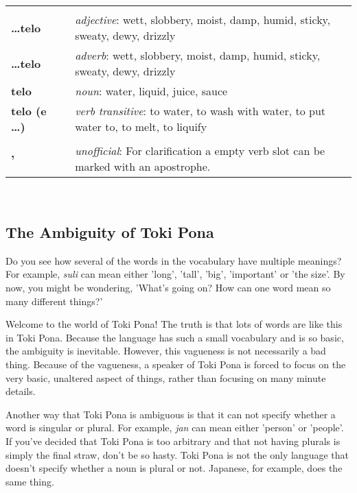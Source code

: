 \begin{supertabular}{p{2,5cm}|ll}
 && \\ %
%
\textbf{\dots telo} && \textit{adjective}: wett, slobbery, moist, damp, humid, sticky, sweaty, dewy, drizzly \\ %
\textbf{\dots telo} && \textit{adverb}: wett, slobbery, moist, damp, humid, sticky, sweaty, dewy, drizzly \\ %
\textbf{telo} && \textit{noun}: water, liquid, juice, sauce \\ %
\textbf{telo (e \dots)} && \textit{verb transitive}: to water, to wash with water, to put water to, to melt, to liquify \\ %
 && \\ %
%
\textbf{'} && \textit{unofficial}: For clarification a empty verb slot can be marked with an apostrophe.  \\ %
%
\end{supertabular} \\
%
\newpage
\subsection*{The Ambiguity of Toki Pona}
%
%
Do you see how several of the words in the vocabulary have multiple meanings? 
For example, \textit{suli} can mean either 'long', 'tall', 'big', 'important' or 'the size'. 
By now, you might be wondering, 'What's going on? How can one word mean so many different things?' 

Welcome to the world of Toki Pona! The truth is that lots of words are like this in Toki Pona. 
Because the language has such a small vocabulary and is so basic, the ambiguity is inevitable. 
However, this vagueness is not necessarily a bad thing. Because of the vagueness, a speaker of Toki Pona is forced to focus on the very basic, unaltered aspect of things, rather than focusing on many minute details. 

Another way that Toki Pona is ambiguous is that it can not specify whether a word is singular or plural. 
For example, \textit{jan} can mean either 'person' or 'people'. 
If you've decided that Toki Pona is too arbitrary and that not having plurals is simply the final straw, don't be so hasty. 
Toki Pona is not the only language that doesn't specify whether a noun is plural or not. 
Japanese, for example, does the same thing. 

